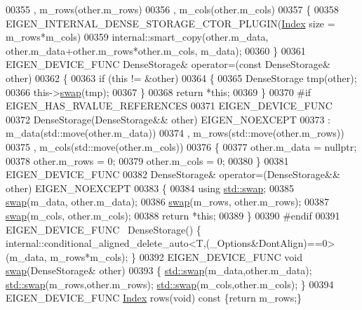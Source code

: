 \begin{DoxyCode}
00355       , m\_rows(other.m\_rows)
00356       , m\_cols(other.m\_cols)
00357     \{
00358       EIGEN\_INTERNAL\_DENSE\_STORAGE\_CTOR\_PLUGIN(\hyperlink{namespace_eigen_a62e77e0933482dafde8fe197d9a2cfde}{Index} size = m\_rows*m\_cols)
00359       internal::smart\_copy(other.m\_data, other.m\_data+other.m\_rows*other.m\_cols, m\_data);
00360     \}
00361     EIGEN\_DEVICE\_FUNC DenseStorage& operator=(\textcolor{keyword}{const} DenseStorage& other)
00362     \{
00363       \textcolor{keywordflow}{if} (\textcolor{keyword}{this} != &other)
00364       \{
00365         DenseStorage tmp(other);
00366         this->\hyperlink{endian_8c_a3ca5ecd34b04d6a243c054ac3a57f68d}{swap}(tmp);
00367       \}
00368       \textcolor{keywordflow}{return} *\textcolor{keyword}{this};
00369     \}
00370 \textcolor{preprocessor}{#if EIGEN\_HAS\_RVALUE\_REFERENCES}
00371     EIGEN\_DEVICE\_FUNC
00372     DenseStorage(DenseStorage&& other) EIGEN\_NOEXCEPT
00373       : m\_data(std::move(other.m\_data))
00374       , m\_rows(std::move(other.m\_rows))
00375       , m\_cols(std::move(other.m\_cols))
00376     \{
00377       other.m\_data = \textcolor{keyword}{nullptr};
00378       other.m\_rows = 0;
00379       other.m\_cols = 0;
00380     \}
00381     EIGEN\_DEVICE\_FUNC
00382     DenseStorage& operator=(DenseStorage&& other) EIGEN\_NOEXCEPT
00383     \{
00384       \textcolor{keyword}{using} \hyperlink{endian_8c_a3ca5ecd34b04d6a243c054ac3a57f68d}{std::swap};
00385       \hyperlink{endian_8c_a3ca5ecd34b04d6a243c054ac3a57f68d}{swap}(m\_data, other.m\_data);
00386       \hyperlink{endian_8c_a3ca5ecd34b04d6a243c054ac3a57f68d}{swap}(m\_rows, other.m\_rows);
00387       \hyperlink{endian_8c_a3ca5ecd34b04d6a243c054ac3a57f68d}{swap}(m\_cols, other.m\_cols);
00388       \textcolor{keywordflow}{return} *\textcolor{keyword}{this};
00389     \}
00390 \textcolor{preprocessor}{#endif}
00391     EIGEN\_DEVICE\_FUNC ~DenseStorage() \{ 
      internal::conditional\_aligned\_delete\_auto<T,(\_Options&DontAlign)==0>(m\_data, m\_rows*m\_cols); \}
00392     EIGEN\_DEVICE\_FUNC \textcolor{keywordtype}{void} \hyperlink{endian_8c_a3ca5ecd34b04d6a243c054ac3a57f68d}{swap}(DenseStorage& other)
00393     \{ \hyperlink{endian_8c_a3ca5ecd34b04d6a243c054ac3a57f68d}{std::swap}(m\_data,other.m\_data); \hyperlink{endian_8c_a3ca5ecd34b04d6a243c054ac3a57f68d}{std::swap}(m\_rows,other.m\_rows); 
      \hyperlink{endian_8c_a3ca5ecd34b04d6a243c054ac3a57f68d}{std::swap}(m\_cols,other.m\_cols); \}
00394     EIGEN\_DEVICE\_FUNC \hyperlink{namespace_eigen_a62e77e0933482dafde8fe197d9a2cfde}{Index} rows(\textcolor{keywordtype}{void})\textcolor{keyword}{ const }\{\textcolor{keywordflow}{return} m\_rows;\}

\end{DoxyCode}
